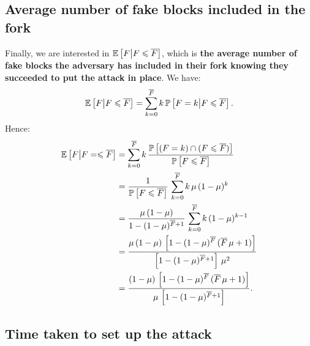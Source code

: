     \subsection{Average number of fake blocks included in the fork}
    
    Finally, we are interested in \(\mathbb{E}\left[F\middle|F\leqslant\overline{F}\right]\), which is \textbf{the average number of fake blocks the adversary has included in their fork knowing they succeeded to put the attack in place}. We have:
    \[\mathbb{E}\left[F\middle|F\leqslant\overline{F}\right] = \sum_{k=0}^{\overline{F}}k\,\mathbb{P}\left[F=k\middle|F\leqslant\overline{F}\right].\]
    Hence:
    \begin{align*}
        \mathbb{E}\left[F\middle|F=\leqslant\overline{F}\right] &= \sum_{k=0}^{\overline{F}}k\,\frac{\mathbb{P}\left[(F=k)\cap(F\leqslant\overline{F})\right]}{\mathbb{P}\left[F\leqslant\overline{F}\right]}\\
        &= \frac{1}{\mathbb{P}\left[F\leqslant\overline{F}\right]}\,\sum_{k=0}^{\overline{F}}k\,\mu\,(1-\mu)^k\\
        &= \frac{\mu\,(1-\mu)}{1 - (1-\mu)^{\overline{F}+1}}\,\sum_{k=0}^{\overline{F}}k\,(1-\mu)^{k-1}\\
        &= \frac{\mu\,(1-\mu)\,\left[1-(1-\mu)^{\overline{F}}\,(\overline{F}\,\mu+1)\right]}{\left[1 - (1-\mu)^{\overline{F}+1}\right]\,\mu^2}\\
        &= \frac{(1-\mu)\,\left[1-(1-\mu)^{\overline{F}}\,(\overline{F}\,\mu+1)\right]}{\mu\,\left[1 - (1-\mu)^{\overline{F}+1}\right]}.
    \end{align*}
    
    \subsection{Time taken to set up the attack}
    
